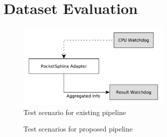 

\section{Dataset Evaluation}

\begin{figure}[ht]
	\includegraphics[width=0.66\textwidth]{diagrams/eval_pipeline_1.pdf}
	\caption{Test scenario for existing pipeline}
	\label{pic:eval_p1_diag}
\end{figure}

\begin{figure}[ht]	
	\centering
	
	\caption{Test scenarios for proposed pipeline}
	\label{pic:eval_p2_4_diag}
\end{figure}


